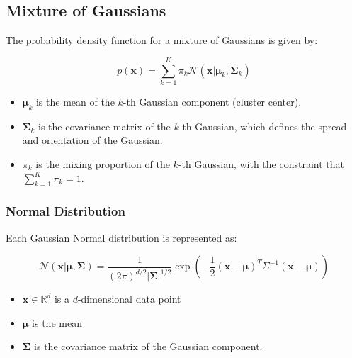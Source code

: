 \subsection{Mixture of Gaussians}
\begin{definition}
    The probability density function for a mixture of Gaussians is given by:

    \[
    p(\mathbf{x}) = \sum_{k=1}^{K} \pi_k \mathcal{N}(\mathbf{x} | \mathbf{\mu}_k, \mathbf{\Sigma}_k)
    \]

    \begin{itemize}
        \item \( \mathbf{\mu}_k \) is the mean of the \( k \)-th Gaussian component (cluster center).
        \item \( \mathbf{\Sigma}_k \) is the covariance matrix of the \( k \)-th Gaussian, which defines the spread and orientation of the Gaussian.
        \item \( \pi_k \) is the mixing proportion of the \( k \)-th Gaussian, with the constraint that \( \sum_{k=1}^{K} \pi_k = 1 \).
    \end{itemize}
\end{definition}

\subsubsection{Normal Distribution}
\begin{definition}
    Each Gaussian Normal distribution is represented as:

    \[
    \mathcal{N}(\mathbf{x} | \mathbf{\mu}, \mathbf{\Sigma}) = \frac{1}{(2\pi)^{d/2} |\mathbf{\Sigma}|^{1/2}} \exp\left( -\frac{1}{2} (\mathbf{x} - \mathbf{\mu})^T \Sigma^{-1} (\mathbf{x} - \mathbf{\mu}) \right)
    \]

    \begin{itemize}
        \item \( \mathbf{x} \in \mathbb{R}^d \) is a \( d \)-dimensional data point
        \item \( \mathbf{\mu} \) is the mean
        \item \( \mathbf{\Sigma} \) is the covariance matrix of the Gaussian component.
    \end{itemize}
\end{definition}

